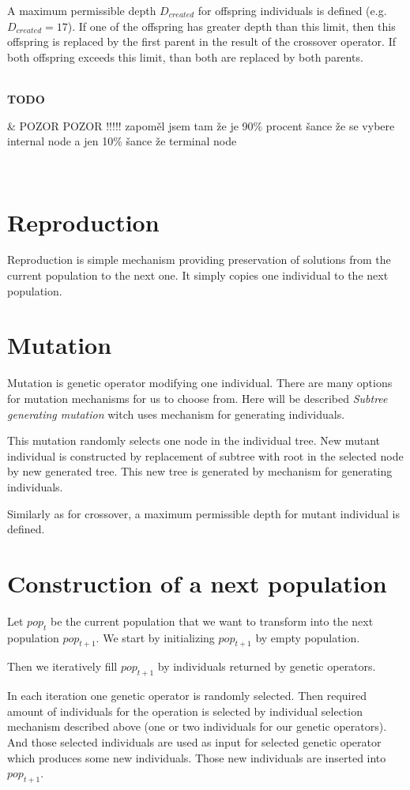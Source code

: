 \documentclass[12pt,a4paper]{report}
\newenvironment{todo}
{ ~\\[0.5em]
  {\color{red}\textbf{TODO}}
  \begin{easylist}[itemize]}
{ \end{easylist}
  ~}
\begin{document}
A maximum permissible depth $D_{created}$ 
for offspring individuals is defined (e.g. $D_{created} = 17$).
If one of the offspring has greater depth than this limit, then 
this offspring is replaced by the first parent in the result of 
the crossover operator. If both offspring exceeds this limit, than 
both are replaced by both parents.  

\begin{todo}
 & POZOR POZOR !!!!! zapoměl jsem tam že je 90\% procent šance 
   že se vybere internal node a jen 10\% šance že terminal node
\end{todo}

\section{Reproduction}

Reproduction is simple mechanism providing preservation of solutions
from the current population to the next one. It simply copies 
one individual to the next population.

\section{Mutation}

Mutation is genetic operator modifying one individual.
There are many options for mutation mechanisms 
for us to choose from. Here will be described 
\textit{Subtree generating mutation} 
witch uses mechanism for generating individuals.

This mutation randomly selects one node in the individual tree.
New mutant individual is constructed by replacement of 
subtree with root in the selected node by new generated
tree. This new tree is generated by mechanism for generating 
individuals.

Similarly as for crossover, a maximum permissible depth for mutant individual 
is defined.


\section{Construction of a next population}

Let $pop_{t}$ be the current population that we want to 
transform into the next population $pop_{t+1}$. 
We start by initializing $pop_{t+1}$ by empty population.

Then we iteratively fill $pop_{t+1}$ by individuals 
returned by genetic operators.

In each iteration one genetic operator is randomly selected.
Then required amount of individuals for the operation is selected
by individual selection mechanism described above (one or two
individuals for our genetic operators).
And those selected individuals are used as input for selected
genetic operator which produces some new individuals.
Those new individuals are inserted into $pop_{t+1}$.
\end{document}
